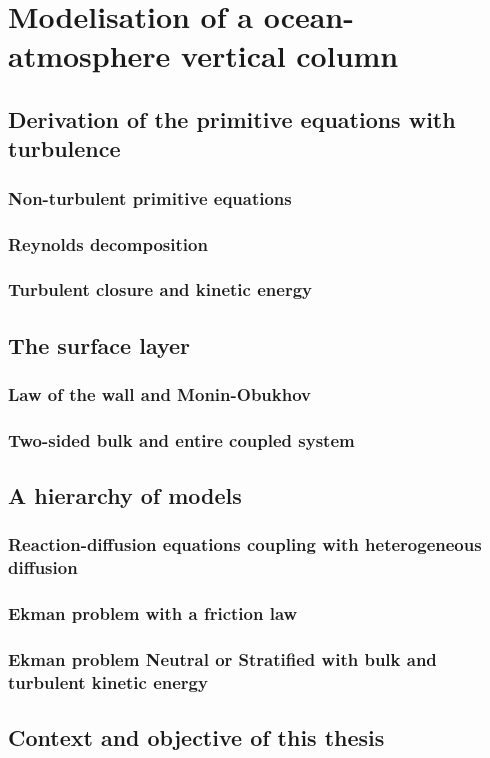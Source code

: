 \chapter{Modelisation of a ocean-atmosphere vertical column}
\label{ch:airseaSCM}
\minitoc
\section{Derivation of the primitive equations with turbulence}
\subsection{Non-turbulent primitive equations}
\subsection{Reynolds decomposition}
\subsection{Turbulent closure and kinetic energy}
\section{The surface layer}
\subsection{Law of the wall and Monin-Obukhov}
\subsection{Two-sided bulk and entire coupled system}
\section{A hierarchy of models}
\subsection{Reaction-diffusion equations coupling
with heterogeneous diffusion}
\subsection{Ekman problem with a friction law}
\label{sec:airseaSCM_hierarchy_Ekman}
\subsection{Ekman problem Neutral or Stratified with bulk and turbulent kinetic energy}
\section{Context and objective of this thesis}
